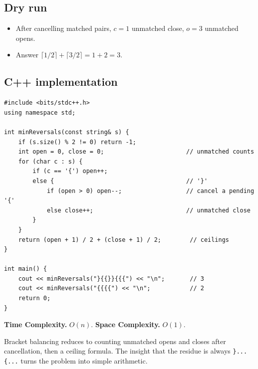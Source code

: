 \subsection*{Dry run}


\begin{itemize}
  \item After cancelling matched pairs, $c=1$ unmatched close, $o=3$
        unmatched opens.
  \item Answer $\lceil1/2\rceil+\lceil3/2\rceil=1+2=3$.
\end{itemize}

\subsection*{C++ implementation}

\begin{lstlisting}
#include <bits/stdc++.h>
using namespace std;

int minReversals(const string& s) {
    if (s.size() % 2 != 0) return -1;
    int open = 0, close = 0;                       // unmatched counts
    for (char c : s) {
        if (c == '{') open++;
        else {                                     // '}'
            if (open > 0) open--;                  // cancel a pending '{'
            else close++;                          // unmatched close
        }
    }
    return (open + 1) / 2 + (close + 1) / 2;        // ceilings
}

int main() {
    cout << minReversals("}{{}}{{{") << "\n";       // 3
    cout << minReversals("{{{{") << "\n";           // 2
    return 0;
}
\end{lstlisting}

\begin{complexitybox}
\textbf{Time Complexity.} $O(n)$. \textbf{Space Complexity.} $O(1)$.
\end{complexitybox}

\begin{takeawaybox}
Bracket balancing reduces to counting unmatched opens and closes after
cancellation, then a ceiling formula. The insight that the residue is always
\texttt{\}...\{...} turns the problem into simple arithmetic.
\end{takeawaybox}
